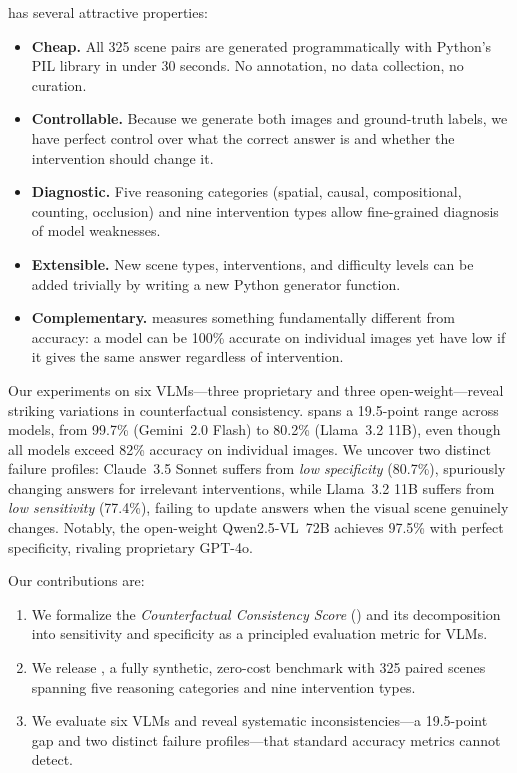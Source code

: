 \method has several attractive properties:
\begin{itemize}[leftmargin=*,nosep]
    \item \textbf{Cheap.} All 325 scene pairs are generated programmatically with Python's PIL library in under 30 seconds. No annotation, no data collection, no curation.
    \item \textbf{Controllable.} Because we generate both images and ground-truth labels, we have perfect control over what the correct answer is and whether the intervention should change it.
    \item \textbf{Diagnostic.} Five reasoning categories (spatial, causal, compositional, counting, occlusion) and nine intervention types allow fine-grained diagnosis of model weaknesses.
    \item \textbf{Extensible.} New scene types, interventions, and difficulty levels can be added trivially by writing a new Python generator function.
    \item \textbf{Complementary.} \ccs measures something fundamentally different from accuracy: a model can be 100\% accurate on individual images yet have low \ccs if it gives the same answer regardless of intervention.
\end{itemize}

Our experiments on six VLMs---three proprietary and three open-weight---reveal striking variations in counterfactual consistency. \ccs spans a 19.5-point range across models, from 99.7\% (Gemini~2.0 Flash) to 80.2\% (Llama~3.2 11B), even though all models exceed 82\% accuracy on individual images. We uncover two distinct failure profiles: Claude~3.5 Sonnet suffers from \emph{low specificity} (80.7\%), spuriously changing answers for irrelevant interventions, while Llama~3.2 11B suffers from \emph{low sensitivity} (77.4\%), failing to update answers when the visual scene genuinely changes. Notably, the open-weight Qwen2.5-VL~72B achieves 97.5\% \ccs with perfect specificity, rivaling proprietary GPT-4o.

Our contributions are:
\begin{enumerate}[leftmargin=*,nosep]
    \item We formalize the \emph{Counterfactual Consistency Score} (\ccs) and its decomposition into sensitivity and specificity as a principled evaluation metric for VLMs.
    \item We release \method, a fully synthetic, zero-cost benchmark with 325 paired scenes spanning five reasoning categories and nine intervention types.
    \item We evaluate six VLMs and reveal systematic inconsistencies---a 19.5-point \ccs gap and two distinct failure profiles---that standard accuracy metrics cannot detect.
\end{enumerate}
